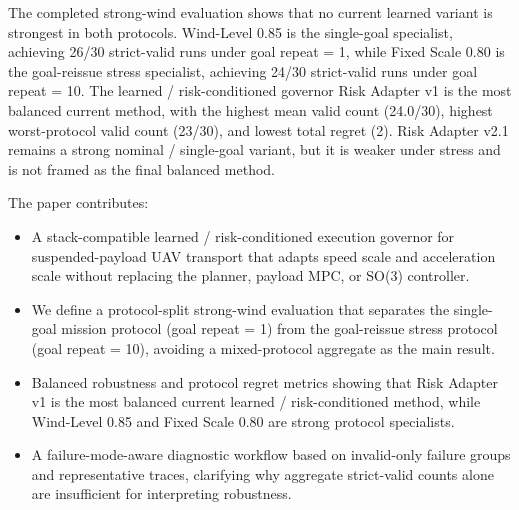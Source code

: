 The completed strong-wind evaluation shows that no current learned variant is
strongest in both protocols. Wind-Level 0.85 is the single-goal specialist,
achieving 26/30 strict-valid runs under goal repeat = 1, while Fixed Scale
0.80 is the goal-reissue stress specialist, achieving 24/30 strict-valid runs
under goal repeat = 10. The learned / risk-conditioned governor Risk Adapter
v1 is the most balanced current method, with the highest mean valid count
(24.0/30), highest worst-protocol valid count (23/30), and lowest total regret
(2). Risk Adapter v2.1 remains a strong nominal / single-goal variant, but it
is weaker under stress and is not framed as the final balanced method.

The paper contributes:

\begin{itemize}
  \item A stack-compatible learned / risk-conditioned execution governor for
  suspended-payload UAV transport that adapts speed scale and acceleration
  scale without replacing the planner, payload MPC, or SO(3) controller.
  \item We define a protocol-split strong-wind evaluation that separates the
  single-goal mission protocol (goal repeat = 1) from the goal-reissue
  stress protocol (goal repeat = 10), avoiding a mixed-protocol
  aggregate as the main result.
  \item Balanced robustness and protocol regret metrics showing that
  Risk Adapter v1 is the most balanced current learned / risk-conditioned
  method, while Wind-Level 0.85 and Fixed Scale 0.80 are strong protocol
  specialists.
  \item A failure-mode-aware diagnostic workflow based on
  invalid-only failure groups and representative traces, clarifying why
  aggregate strict-valid counts alone are insufficient for interpreting
  robustness.
\end{itemize}
